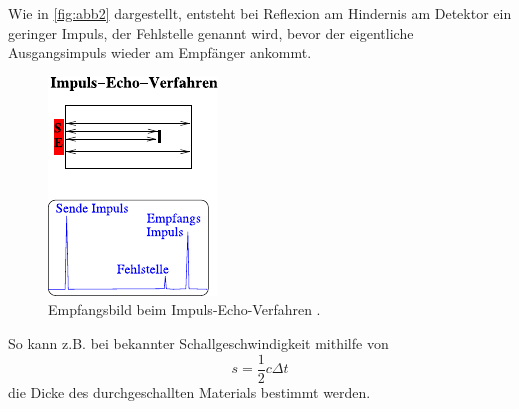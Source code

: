 Wie in \autoref{fig:abb2} dargestellt, entsteht bei Reflexion am Hindernis am Detektor ein geringer
Impuls, der Fehlstelle genannt wird, bevor der eigentliche Ausgangsimpuls
wieder am Empfänger ankommt.

\begin{figure}
    \centering
    \includegraphics{figures/abb2.pdf}
    \caption{Empfangsbild beim Impuls-Echo-Verfahren \cite{ap06}.}
    \label{fig:abb2}
\end{figure}

So kann z.B. bei bekannter Schallgeschwindigkeit mithilfe von
\begin{equation}
    s = \dfrac{1}{2} c \Delta t
    \label{eq:schallges}
\end{equation}
die Dicke des durchgeschallten Materials bestimmt werden. 

